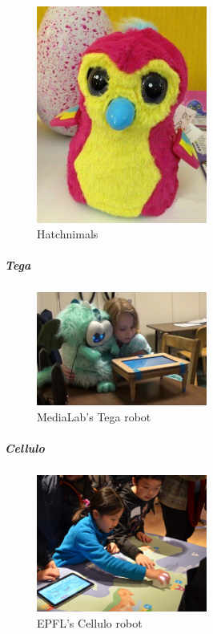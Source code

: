 \documentclass[]{article}
\begin{document}
\begin{figure}
\centering
\includegraphics[width=0.5\textwidth,height=\textheight]{figs/hatchnimals.jpg}
\caption{Hatchnimals}
\end{figure}

\subparagraph{Tega}\label{tega}

\begin{figure}
\centering
\includegraphics[width=0.5\textwidth,height=\textheight]{figs/tega.jpg}
\caption{MediaLab's Tega robot}
\end{figure}

\subparagraph{Cellulo}\label{cellulo}

\begin{figure}
\centering
\includegraphics[width=0.5\textwidth,height=\textheight]{figs/cellulo.jpg}
\caption{EPFL's Cellulo robot}
\end{figure}
\end{document}
